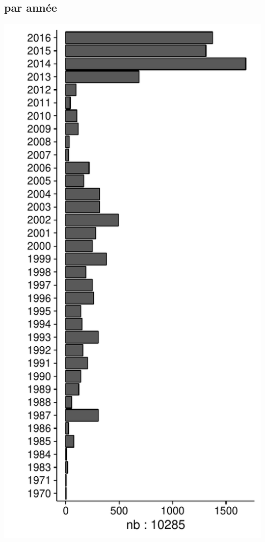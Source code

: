 \subsection*{par année}
\includegraphics[width=\malargeurgraphique]{images/faune_prec_stat_champ_annee.pdf}
